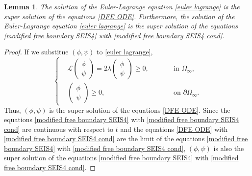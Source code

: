 \documentclass[11pt]{amsart}
\numberwithin{equation}{section}
\theoremstyle{plain}
\newtheorem{lemma}[theorem]{Lemma}
\theoremstyle{definition}
\begin{document}
\begin{lemma}
	The solution of the Euler-Lagrange equation \cref{euler lagrange} is the super solution of the equations \cref{DFE ODE}. Furthermore, the solution of the Euler-Lagrange equation \cref{euler lagrange} is the super solution of the equations \cref{modified free boundary SEIS4} with \cref{modified free boundary SEIS4 cond}.
\end{lemma}
\begin{proof}
	If we substitue $(\phi, \psi)$ to \cref{euler lagrange},
	\begin{equation*}
		\left \{ \begin{aligned}
			&\mathcal{L}\begin{pmatrix}
				\phi\\
				\psi
			\end{pmatrix}=2\lambda\begin{pmatrix}
				\phi\\
				\psi
			\end{pmatrix}\geq 0, \qquad &&\text{in } \Omega_\infty,\\
			&\begin{pmatrix}
				\phi\\
				\psi
			\end{pmatrix}\geq 0, &&\text{on } \partial \Omega_\infty.
		\end{aligned} \right.
	\end{equation*}
	Thus, $(\phi, \psi)$ is the super solution of the equations \cref{DFE ODE}. Since the equations \cref{modified free boundary SEIS4} with \cref{modified free boundary SEIS4 cond} are continuous with respect to $t$ and the equations \cref{DFE ODE} with \cref{modified free boundary SEIS4 cond} are the limit of the equations \cref{modified free boundary SEIS4} with \cref{modified free boundary SEIS4 cond}, $(\phi, \psi)$ is also the super solution of the equations \cref{modified free boundary SEIS4} with \cref{modified free boundary SEIS4 cond}.
\end{proof}
\end{document}
